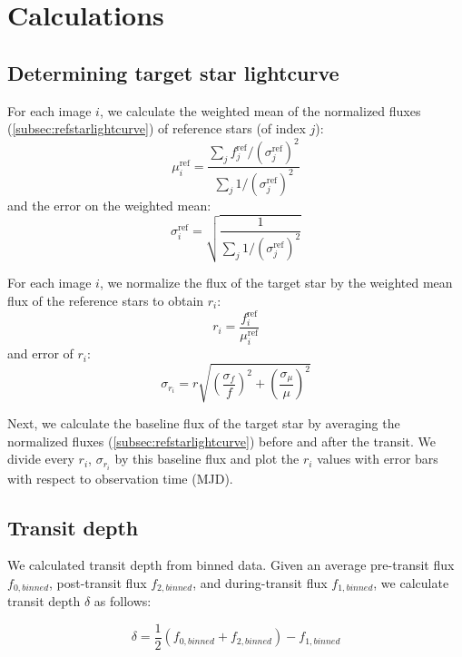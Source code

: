 \documentclass[twocolumn]{aastex631}
\begin{document}
\appendix
\section{Calculations}

\subsection{Determining target star lightcurve}

For each image $i$, we calculate the weighted mean of the normalized fluxes (\ref{subsec:refstarlightcurve}) of reference stars (of index $j$):
\begin{equation}\label{eqn:ref_star_mean}
\mu_i^{\text{ref}} = \frac{\sum_j f_j^{\text{ref}}/(\sigma_j^{\text{ref}})^2}{\sum_j 1/(\sigma_j^{\text{ref}})^2}
\end{equation}
and the error on the weighted mean:
\begin{equation}\label{eqn:ref_star_mean_err}
    \sigma_i^{\text{ref}} = \sqrt{ \frac{1}{\sum_j 1/(\sigma_j^{\text{ref}})^2} }
\end{equation}

For each image $i$, we normalize the flux of the target star by the weighted mean flux of the reference stars to obtain $r_i$:
\begin{equation}
    r_i = \frac{f_i^{\text{ref}}}{\mu_i^{\text{ref}}}
\end{equation}
and error of $r_i$:
\begin{equation}
    \sigma_{r_i} = r \sqrt{ \left( \frac{\sigma_f}{f} \right) ^2 + \left( \frac{\sigma_\mu}{\mu} \right) ^2 }
\end{equation}

Next, we calculate the baseline flux of the target star by averaging the normalized fluxes (\ref{subsec:refstarlightcurve}) before and after the transit. We divide every $r_i$, $\sigma_{r_i}$ by this baseline flux and plot the $r_i$ values with error bars with respect to observation time (MJD).

\subsection{Transit depth}

We calculated transit depth from binned data. Given an average pre-transit flux $f_{0,binned}$, post-transit flux $f_{2,binned}$, and during-transit flux $f_{1,binned}$, we calculate transit depth $\delta$ as follows:

\begin{equation} \label{eqn:transit_depth}
    \delta = \frac{1}{2} (f_{0,binned} + f_{2,binned}) - f_{1,binned}
\end{equation}
\end{document}
